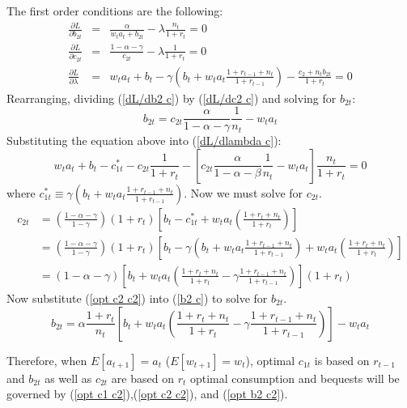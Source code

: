 \documentclass{article}
\begin{document}
The first order conditions are the following:
\begin{eqnarray}
\frac{\partial L}{\partial b_{2t}} &=& \frac{\alpha}{w_t a_t + b_{2t}} - \lambda \frac{n_t}{1+r_t} = 0\label{dL/db2 c}\\
\frac{\partial L}{\partial c_{2t}} &=& \frac{1-\alpha-\gamma}{c_{2t}}-\lambda\frac{1}{1+r_t} = 0\label{dL/dc2 c}\\
\frac{\partial L}{\partial \lambda} &=& w_t a_t + b_t - \gamma(b_t+w_t a_t \frac{1+r_{t-1}+n_t}{1+r_{t-1}} ) - \frac{c_{2} + n_t b_{2t}}{1+r_t} = 0\label{dL/dlambda c}
\end{eqnarray}
Rearranging, dividing (\ref{dL/db2 c}) by (\ref{dL/dc2 c}) and solving for $b_{2t}$:
\begin{equation}\label{b2 c}
b_{2t} = c_{2t}\frac{\alpha}{1-\alpha-\gamma}\frac{1}{n_t}-w_t a_t
\end{equation}
Substituting the equation above into (\ref{dL/dlambda c}):
\begin{equation}
w_t a_t + b_t - c^{*}_{1t} - c_{2t}\frac{1}{1+r_t} - [c_{2t}\frac{\alpha}{1-\alpha-\beta}\frac{1}{n_t}-w_t a_t]\frac{n_t}{1+r_t} = 0
\end{equation}
where $c^{*}_{1t} \equiv \gamma(b_t + w_t a_t\frac{1+r_{t-1}+n_t}{1+r_{t-1}} )$.  Now we must solve for $c_{2t}$.
\begin{equation}\label{opt c2 c2}
\begin{split}
c_{2t}
&= (\frac{1-\alpha-\gamma}{1-\gamma})(1+r_t)[ b_t-c^{*}_{1t} + w_t a_t (\frac{1+r_t+n_t}{1+r_t}) ]\\
&= (\frac{1-\alpha-\gamma}{1-\gamma})(1+r_t)[ b_t-\gamma(b_t + w_t a_t\frac{1+r_{t-1}+n_t}{1+r_{t-1}} ) + w_t a_t (\frac{1+r_t+n_t}{1+r_t}) ]\\
&= (1-\alpha-\gamma)[b_t + w_t a_t (\frac{1+r_t+n_t}{1+r_t}-\gamma \frac{1+r_{t-1}+n_t}{1+r_{t-1}})](1+r_t)
\end{split}
\end{equation}
Now substitute (\ref{opt c2 c2}) into (\ref{b2 c}) to solve for $b_{2t}$.
\begin{equation}\label{opt b2 c2}
b_{2t} = \alpha\frac{1+r_t}{n_t}[b_t + w_t a_t (\frac{1+r_t+n_t}{1+r_t}-\gamma \frac{1+r_{t-1}+n_t}{1+r_{t-1}})] - w_t a_t
\end{equation}

Therefore, when $E[a_{t+1}]=a_t$ ($E[w_{t+1}] = w_t$), optimal $c_{1t}$ is based on $r_{t-1}$ and $b_{2t}$ as well as $c_{2t}$ are based on $r_t$ optimal consumption and bequests will be governed by (\ref{opt c1 c2}),(\ref{opt c2 c2}), and (\ref{opt b2 c2}).
\end{document}
